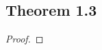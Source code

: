 \documentclass[../../main.tex]{subfiles}
\begin{document}
\subsection{Theorem 1.3}
\begin{wts}

\end{wts}
\begin{proof}

\end{proof}
\end{document}
